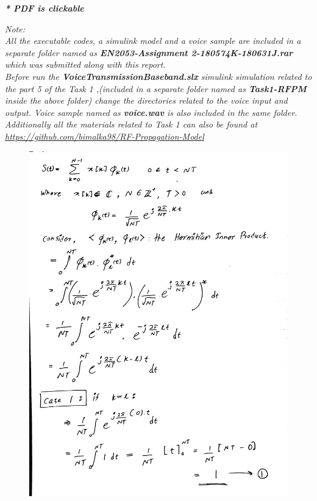 \documentclass[a4paper,11pt]{article}%
\begin{document}

\tableofcontents

\begin{center}
	\textbf{\textit{* PDF is clickable}}
\end{center}



\textit{Note:}\\

\textit{All the executable codes, a simulink model and a voice sample are included in a separate folder named as \textbf{EN2053-Assignment 2-180574K-180631J.rar} which was submitted along with this report.}\\

\textit{Before run the \textbf{VoiceTransmissionBaseband.slx} simulink simulation related to the part 5 of the Task 1 ,(included in a separate folder named as \textbf{Task1-RFPM} inside the above folder) change the directories related to the voice input and output. Voice sample named as \textbf{voice.wav} is also included in the same folder.}\\

\textit{Additionally all the materials related to Task 1 can also be found at \url{https://github.com/bimalka98/RF-Propagation-Model}}



\pagebreak
\begin{figure}[!h]
	\includegraphics[scale=0.22]{figures/img0}
\end{figure}
\end{document}
